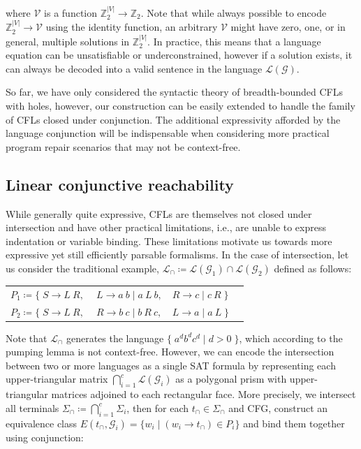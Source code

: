 \documentclass[sigplan,review,anonymous,acmsmall]{acmart}\settopmatter{printfolios=false,printccs=false,printacmref=false}
\begin{document}
\noindent where $\mathcal{V}$ is a function $\mathbb{Z}_2^{|V|}\rightarrow\mathbb{Z}_2$. Note that while always possible to encode $\mathbb{Z}_2^{|V|} \rightarrow \mathcal{V}$ using the identity function, an arbitrary $\mathcal{V}$ might have zero, one, or in general, multiple solutions in $\mathbb{Z}_2^{|V|}$. In practice, this means that a language equation can be unsatisfiable or underconstrained, however if a solution exists, it can always be decoded into a valid sentence in the language $\mathcal{L}(\mathcal{G})$.

So far, we have only considered the syntactic theory of breadth-bounded CFLs with holes, however, our construction can be easily extended to handle the family of CFLs closed under conjunction. The additional expressivity afforded by the language conjunction will be indispensable when considering more practical program repair scenarios that may not be context-free.

\subsection{Linear conjunctive reachability}\label{sec:lclreach}

While generally quite expressive, CFLs are themselves not closed under intersection and have other practical limitations, i.e., are unable to express indentation or variable binding. These limitations motivate us towards more expressive yet still efficiently parsable formalisms. In the case of intersection, let us consider the traditional example, $\mathcal{L}_\cap \coloneqq \mathcal{L}(\mathcal{G}_1) \cap \mathcal{L}(\mathcal{G}_2)$ defined as follows:

\begin{table}[H]
  \begin{tabular}{llll}
    $P_1 \coloneqq \big\{\;S \rightarrow L\:R,$ & $\:L \rightarrow a\:b \mid a\:L\:b,$ & $R \rightarrow c \mid c \:R\;\big\}$\vspace{5pt}\\
    $P_2 \coloneqq \big\{\;S \rightarrow L\:R,$ & $\:R \rightarrow b\:c \mid b\:R\:c,$ & $L \rightarrow a \mid a \:L\;\big\}$
  \end{tabular}
\end{table}

\noindent Note that $\mathcal{L}_\cap$ generates the language $\big\{\;a^d b^d c^d \mid d > 0\;\big\}$, which according to the pumping lemma is not context-free. However, we can encode the intersection between two or more languages as a single SAT formula by representing  each upper-triangular matrix $\bigcap_{i=1}^c \mathcal{L}(\mathcal{G}_i)$ as a polygonal prism with upper-triangular matrices adjoined to each rectangular face. More precisely, we intersect all terminals $\Sigma_\cap \coloneqq \bigcap_{i=1}^c \Sigma_i$, then for each $t_\cap \in \Sigma_\cap$ and CFG, construct an equivalence class $E(t_\cap, \mathcal{G}_i) = \{ w_i \mid (w_i \rightarrow t_\cap) \in P_i\}$ and bind them together using conjunction:\vspace{-5pt}
\end{document}
